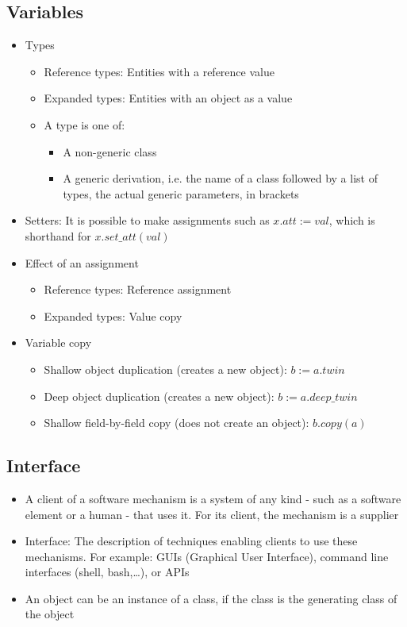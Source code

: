 \documentclass[a4paper]{article}
\begin{document}
\subsection{Variables}
\begin{itemize}
\item Types
\begin{itemize}
\item Reference types: Entities with a reference value
\item Expanded types: Entities with an object as a value
\item A type is one of:
\begin{itemize}
\item A non-generic class
\item A generic derivation, i.e. the name of a class followed by a list of types, the actual generic parameters, in brackets
\end{itemize}
\end{itemize}
\item Setters: It is possible to make assignments such as $x.att:=val$, which is shorthand for $x.set\_att(val)$
\item Effect of an assignment
\begin{itemize}
\item Reference types: Reference assignment
\item Expanded types: Value copy
\end{itemize}
\item Variable copy
\begin{itemize}
\item Shallow object duplication (creates a new object): $b:=a.twin$
\item Deep object duplication (creates a new object): $b:=a.deep\_twin$
\item Shallow field-by-field copy (does not create an object): $b.copy(a)$
\end{itemize}
\end{itemize}

\subsection{Interface}
\begin{itemize}
\item A client of a software mechanism is a system of any kind - such as a software element or a human - that uses it. For its client, the mechanism is a supplier
\item Interface: The description of techniques enabling clients to use these mechanisms. For example: GUIs (Graphical User Interface), command line interfaces (shell, bash,\dots), or APIs
\item An object can be an instance of a class, if the class is the generating class of the object
\end{itemize}
\end{document}
